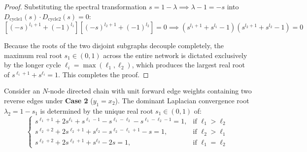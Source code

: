 \begin{proof}
Substituting the spectral transformation $s = 1 - \lambda \implies \lambda - 1 = -s$ into $D_{\text{cycle1}}(s) \cdot D_{\text{cycle2}}(s) = 0$:
\begin{equation}
	\left[ (-s)^{l_1+1} + (-1)^{l_1} \right] \left[ (-s)^{l_2+1} + (-1)^{l_2} \right] = 0 \implies \left( s^{l_1+1} + s^{l_1} - 1 \right) \left( s^{l_2+1} + s^{l_2} - 1 \right) = 0
\end{equation}

Because the roots of the two disjoint subgraphs decouple completely, the maximum real root $s_1 \in (0,1)$ across the entire network is dictated exclusively by the longer cycle $\ell_i = \max(\ell_1, \ell_2)$, which produces the largest real root of $s^{\ell_i+1} + s^{\ell_i} = 1$. This completes the proof.
\end{proof}

\begin{theo}\label{Theoremcase2}
Consider an $N$-node directed chain with unit forward edge weights containing two reverse edges under \textbf{Case 2} ($y_1 = x_2$). The dominant Laplacian convergence root $\lambda_2 = 1 - s_1$ is determined by the unique real root $s_1 \in (0,1)$ of:
\begin{equation}\label{eq:case2_theorem_statement}
	\begin{cases}
		s^{\ell_1+1} + 2s^{\ell_1} + s^{\ell_1-1} - s^{\ell_1-\ell_2} - s^{\ell_1-\ell_2-1} = 1, & \text{if } \ell_1 > \ell_2 \\
		s^{\ell_2+2} + 2s^{\ell_2+1} + s^{\ell_2} - s^{\ell_2-\ell_1+1} - s = 1, & \text{if } \ell_2 > \ell_1 \\
		s^{\ell_2+2} + 2s^{\ell_2+1} + s^{\ell_2} - 2s = 1, & \text{if } \ell_1 = \ell_2
	\end{cases}
\end{equation}
\end{theo}

